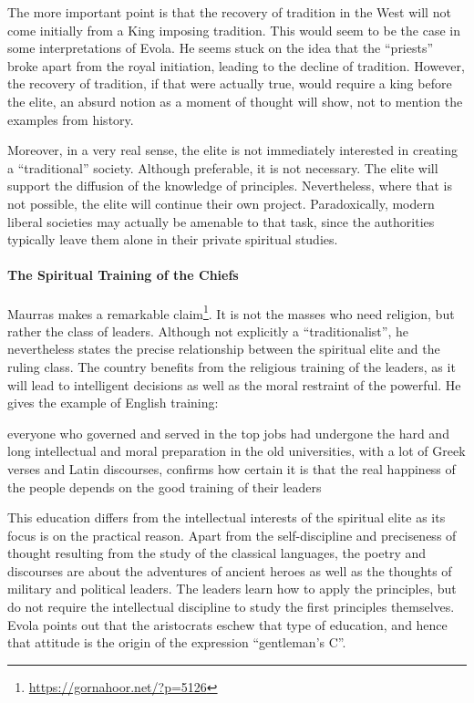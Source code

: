 The more important point is that the recovery of tradition in the West will not come initially from a King imposing tradition. This would seem to be the case in some interpretations of Evola. He seems stuck on the idea that the ``priests'' broke apart from the royal initiation, leading to the decline of tradition. However, the recovery of tradition, if that were actually true, would require a king before the elite, an absurd notion as a moment of thought will show, not to mention the examples from history.

Moreover, in a very real sense, the elite is not immediately interested in creating a ``traditional'' society. Although preferable, it is not necessary. The elite will support the diffusion of the knowledge of principles. Nevertheless, where that is not possible, the elite will continue their own project. Paradoxically, modern liberal societies may actually be amenable to that task, since the authorities typically leave them alone in their private spiritual studies.

\paragraph{The Spiritual Training of the Chiefs}

Maurras makes a remarkable claim\footnote{\url{https://gornahoor.net/?p=5126}}. It is not the masses who need religion, but rather the class of leaders. Although not explicitly a ``traditionalist'', he nevertheless states the precise relationship between the spiritual elite and the ruling class. The country benefits from the religious training of the leaders, as it will lead to intelligent decisions as well as the moral restraint of the powerful. He gives the example of English training:

\begin{quotex}
everyone who governed and served in the top jobs had undergone the hard and long intellectual and moral preparation in the old universities, with a lot of Greek verses and Latin discourses, confirms how certain it is that the real happiness of the people depends on the good training of their leaders
\end{quotex}


This education differs from the intellectual interests of the spiritual elite as its focus is on the practical reason. Apart from the self-discipline and preciseness of thought resulting from the study of the classical languages, the poetry and discourses are about the adventures of ancient heroes as well as the thoughts of military and political leaders. The leaders learn how to apply the principles, but do not require the intellectual discipline to study the first principles themselves. Evola points out that the aristocrats eschew that type of education, and hence that attitude is the origin of the expression ``gentleman's C''.

